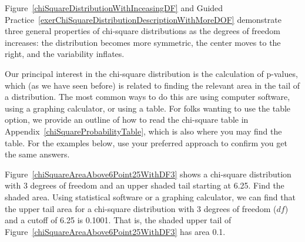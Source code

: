 Figure~\ref{chiSquareDistributionWithInceasingDF} and Guided Practice~\ref{exerChiSquareDistributionDescriptionWithMoreDOF} demonstrate three general properties of chi-square distributions as the degrees of freedom increases: the distribution becomes more symmetric, the center moves to the right, and the variability inflates.

Our principal interest in the chi-square distribution
is the calculation of p-values, which (as we have seen before)
is related to finding the relevant area in the tail of
a distribution.
The most common ways to do this are using computer software,
using a graphing calculator, or using a table.
For folks wanting to use the table option,
we provide an outline of how to read the chi-square table in
Appendix~\ref{chiSquareProbabilityTable},
which is also where you may find the table.
For the examples below, use your preferred approach
to confirm you get the same answers.

\begin{examplewrap}
\begin{nexample}{Figure~\ref{chiSquareAreaAbove6Point25WithDF3}
    shows a chi-square distribution with 3 degrees of freedom
    and an upper shaded tail starting at 6.25.
    Find the shaded area.}
  Using statistical software or a graphing calculator,
  we can find that the upper tail area for a chi-square
  distribution with 3 degrees of freedom ($df$)
  and a cutoff of 6.25 is 0.1001.
  That is, the shaded upper tail of
  Figure~\ref{chiSquareAreaAbove6Point25WithDF3}
  has area 0.1.
\end{nexample}
\end{examplewrap}

